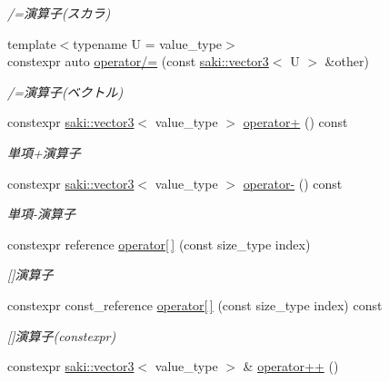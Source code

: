 \begin{DoxyCompactItemize}
\begin{DoxyCompactList}\small\item\em /=演算子(スカラ) \end{DoxyCompactList}\item 
{\footnotesize template$<$typename U  = value\+\_\+type$>$ }\\constexpr auto \mbox{\hyperlink{classsaki_1_1vector3_ad50fe15d3b66f8c90775b595ee0c7472}{operator/=}} (const \mbox{\hyperlink{classsaki_1_1vector3}{saki\+::vector3}}$<$ U $>$ \&other)
\begin{DoxyCompactList}\small\item\em /=演算子(ベクトル) \end{DoxyCompactList}\item 
constexpr \mbox{\hyperlink{classsaki_1_1vector3}{saki\+::vector3}}$<$ value\+\_\+type $>$ \mbox{\hyperlink{classsaki_1_1vector3_a8417faf227247d5062195eb6d8a513fc}{operator+}} () const
\begin{DoxyCompactList}\small\item\em 単項+演算子 \end{DoxyCompactList}\item 
constexpr \mbox{\hyperlink{classsaki_1_1vector3}{saki\+::vector3}}$<$ value\+\_\+type $>$ \mbox{\hyperlink{classsaki_1_1vector3_a6b8e1173064629de9e97c63f718d0a74}{operator-\/}} () const
\begin{DoxyCompactList}\small\item\em 単項-\/演算子 \end{DoxyCompactList}\item 
constexpr reference \mbox{\hyperlink{classsaki_1_1vector3_aa6b26c430b47bc51d614bd55ba636b7f}{operator\mbox{[}$\,$\mbox{]}}} (const size\+\_\+type index)
\begin{DoxyCompactList}\small\item\em \mbox{[}\mbox{]}演算子 \end{DoxyCompactList}\item 
constexpr const\+\_\+reference \mbox{\hyperlink{classsaki_1_1vector3_a540ef290a40ceb4023b1f5153eee7da6}{operator\mbox{[}$\,$\mbox{]}}} (const size\+\_\+type index) const
\begin{DoxyCompactList}\small\item\em \mbox{[}\mbox{]}演算子(constexpr) \end{DoxyCompactList}\item 
constexpr \mbox{\hyperlink{classsaki_1_1vector3}{saki\+::vector3}}$<$ value\+\_\+type $>$ \& \mbox{\hyperlink{classsaki_1_1vector3_afa127eca73c7de76a82bb158e78c1d70}{operator++}} ()

\end{DoxyCompactItemize}
